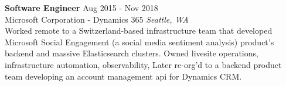 \begin{mdframed}[linewidth=2,linecolor=green, innertopmargin=1em, innerbottommargin=0em, topline=false, rightline=false, bottomline=false]
    \textbf{Software Engineer} \hfill Aug 2015 - Nov 2018\\
    Microsoft Corporation - Dynamics 365 \hfill \textit{Seattle, WA} \vspace{1em} \\
    Worked remote to a Switzerland-based infrastructure team that developed Microsoft Social Engagement (a social media sentiment analysis) product's backend and massive Elasticsearch clusters. Owned livesite operations, infrastructure automation, observability,  Later re-org'd to a backend product team developing an account management api for Dynamics CRM.\vspace{0.5em}
    \end{mdframed}

